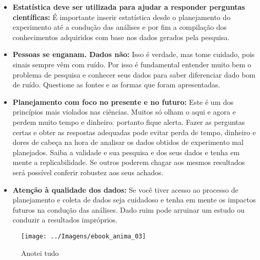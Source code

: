 \documentclass[11pt,]{style/krantz}
\theoremstyle{definition}
\theoremstyle{definition}
\theoremstyle{definition}
\theoremstyle{remark}
\begin{document}
\begin{itemize}
\item
  \textbf{Estatística deve ser utilizada para ajudar a responder perguntas científicas:} É importante inserir estatística desde o planejamento do experimento até a condução das análises e por fim a compilação dos conhecimentos adquiridos com base nos dados gerados pela pesquisa.
\item
  \textbf{Pessoas se enganam. Dados não:} Isso é verdade, mas tome cuidado, pois sinais sempre vêm com ruído. Por isso é fundamental entender muito bem o problema de pesquisa e conhecer seus dados para saber diferenciar dado bom de ruído. Questione as fontes e as formas que foram apresentadas.
\item
  \textbf{Planejamento com foco no presente e no futuro:} Este é um dos princípios mais violados nas ciências. Muitos só olham o aqui e agora e perdem muito tempo e dinheiro. portanto fique alerta. Fazer as perguntas certas e obter as respostas adequadas pode evitar perda de tempo, dinheiro e dores de cabeça na hora de analisar os dados obtidos de experimento mal planejados. Saiba a validade e sua pesquisa e dos seus dados e tenha em mente a replicabilidade. Se outros poderem chagar aos mesmos resultados será possível conferir robustez aos seus achados.
\item
  \textbf{Atenção à qualidade dos dados:} Se você tiver acesso ao processo de planejamento e coleta de dados seja cuidadoso e tenha em mente os impactos futuros na condução das análises. Dado ruim pode arruinar um estudo ou conduzir a resultados impróprios.
\end{itemize}

\begin{figure}[H]

{\centering \texttt{[image: ../Imagens/ebook\_anima\_03]} 

}

\caption{Anotei tudo}\label{fig:fig03}
\end{figure}
\end{document}
